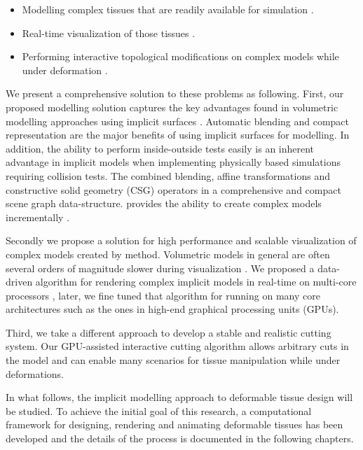 \begin{itemize}
 \item Modelling complex tissues that are readily available for simulation \cite{Nealen2006,Meier2005,Gibson1997a}.
 \item Real-time visualization of those tissues \cite{Mario2010PolygonMesh,Bloomenthal1997}.
 \item Performing interactive topological modifications on complex models while under deformation \cite{Jin2013, Wu2011, Courtecuisse2010, Jerabkova2010}. 
\end{itemize}

We present a comprehensive solution to these problems as following. 
First, our proposed modelling solution captures the key advantages found in volumetric modelling approaches using 
implicit surfaces \cite{Bloomenthal1997, Wyvill1986, Wyvill1999, Wyvill1996, Wyvill1997, Schmidt2006, Bernhardt2010}. Automatic blending and compact 
representation are the major benefits of using implicit surfaces for modelling. In addition, the ability to perform inside-outside tests 
easily is an inherent advantage in implicit models when implementing physically based simulations requiring collision tests. 
The \blob \cite{Wyvill1999} combined blending, affine transformations and constructive solid geometry (CSG) operators in a 
comprehensive and compact scene graph data-structure. \blob provides the ability to create complex models incrementally \cite{Schmidt2006}. 

Secondly we propose a solution for high performance and scalable visualization of complex models created by \blob method.
Volumetric models in general are often several orders of magnitude slower during visualization \cite{Bloomenthal1990a, Bloomenthal1997}.
We proposed a data-driven algorithm for rendering complex implicit models in real-time on multi-core processors \cite{Shirazian2012}, later, we 
fine tuned that algorithm for running on many core architectures such as the ones in high-end graphical processing units (GPUs). 

Third, we take a different approach to develop a stable and realistic cutting system. Our GPU-assisted interactive cutting algorithm allows
arbitrary cuts in the model and can enable many scenarios for tissue manipulation while under deformations. 

In what follows, the implicit modelling approach to deformable tissue design will be studied. To achieve the initial goal of this research, a
computational framework for designing, rendering and animating deformable tissues has been developed and the details of the process is documented 
in the following chapters. 


